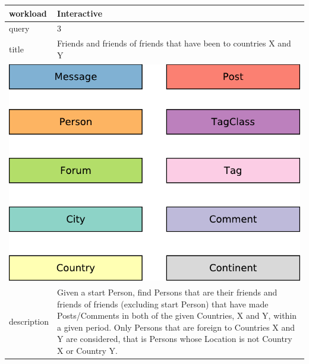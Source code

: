 \renewcommand*{\arraystretch}{1.1}

\noindent\begin{tabularx}{17cm}{|p{1.95cm}|X|}
	\hline
	workload    & Interactive \\ \hline
%
	query       & 3 \\ \hline
%
	title       & Friends and friends of friends that have been to countries X and Y \\ \hline
	\multicolumn{2}{|c|}{ \includegraphics[scale=\patternscale,margin=0cm .2cm]{patterns/interactive03}} \\ \hline
	description & Given a start Person, find Persons that are their friends and friends of
friends (excluding start Person) that have made Posts/Comments in both
of the given Countries, X and Y, within a given period. Only Persons
that are foreign to Countries X and Y are considered, that is Persons
whose Location is not Country X or Country Y.
 \\ \hline
	

\end{tabularx}
